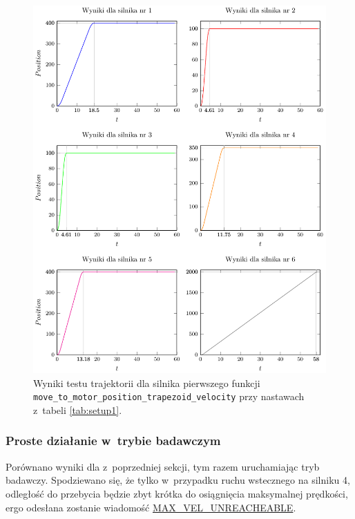 \documentclass[a4paper, 12pt]{article}
\begin{document}
	\begin{figure}[H]
		\centering
		\includegraphics[scale=1.1]{raport_graphs/simpMPVall.pdf}
		\caption{Wyniki testu trajektorii dla silnika pierwszego funkcji \texttt{move\_to\_motor\_position\_trapezoid\_velocity} przy nastawach z~tabeli \ref{tab:setup1}.}
		\label{fig:simpMPVall}
	\end{figure}
		
	\newpage
	\subsubsection{Proste działanie w~trybie badawczym}
	\label{sec:MPVR}
	Porównano wyniki dla z~poprzedniej sekcji, tym razem uruchamiając tryb badawczy. Spodziewano się, że tylko w~przypadku ruchu wstecznego na silniku 4, odległość do przebycia będzie zbyt krótka do osiągnięcia maksymalnej prędkości, ergo odesłana zostanie wiadomość \hyperref[tab:resultcodes]{MAX\_VEL\_UNREACHEABLE}.
	
\end{document}
